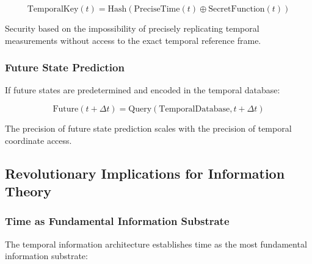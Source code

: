 \documentclass[12pt,a4paper]{article}
\begin{document}
{{{{{{{{{{{{{{\begin{equation}
\text{TemporalKey}(t) = \text{Hash}(\text{PreciseTime}(t) \oplus \text{SecretFunction}(t))
\end{equation}

Security based on the impossibility of precisely replicating temporal measurements without access to the exact temporal reference frame.

\subsubsection{Future State Prediction}

If future states are predetermined and encoded in the temporal database:

\begin{equation}
\text{Future}(t + \Delta t) = \text{Query}(\text{TemporalDatabase}, t + \Delta t)
\end{equation}

The precision of future state prediction scales with the precision of temporal coordinate access.

\subsection{Revolutionary Implications for Information Theory}

\subsubsection{Time as Fundamental Information Substrate}

The temporal information architecture establishes time as the most fundamental information substrate:

\begin{figure}[H]
\centering
{}
\end{figure}}}}}}}}}}}}}}}
\end{document}
